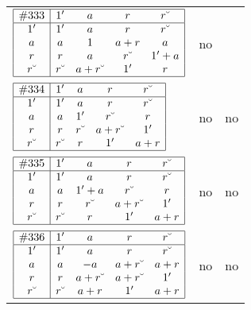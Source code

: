 \documentclass[12pt]{article}
\newcommand{\join}{\mathbin{+}}%
\newcommand{\con}[1]{#1\breve{\ }}
\newcommand{\id}{{1'}}%
\renewcommand{\top}{1}%
\begin{document}
\begin{center}
\begin{longtable}{l|c|c}
$
\begin{array}{|c|cccc|} \hline
\#333 & \id & a & r & \con{r} \\ \hline
\id & \id & a & r & \con{r} \\
a & a & \top & a \join r & a \\
r & r & a & \con{r} & \id \join a \\
\con{r} & \con{r} & a \join \con{r} & \id & r \\ \hline
\end{array}
$
 & no  
 & \adjustbox{valign=c, max height=1.6cm}{$
\left[ \begin{array}{cccccc}
\id & a & r & \con{r} & a & a \\ 
a & \id & a & a & a & r \\ 
\con{r} & a & \id & r & a & a \\ 
r & a & \con{r} & \id & a & a \\ 
a & a & a & a & \id & r \\ 
a & \con{r} & a & a & \con{r} & \id
\end{array}\right]
$}      \\[15mm]

$
\begin{array}{|c|cccc|} \hline
\#334 & \id & a & r & \con{r} \\ \hline
\id & \id & a & r & \con{r} \\
a & a & \id & \con{r} & r \\
r & r & \con{r} & a \join \con{r} & \id \\
\con{r} & \con{r} & r & \id & a \join r \\ \hline
\end{array}
$
 & no  
 & no       \\[15mm]

$
\begin{array}{|c|cccc|} \hline
\#335 & \id & a & r & \con{r} \\ \hline
\id & \id & a & r & \con{r} \\
a & a & \id \join a & \con{r} & r \\
r & r & \con{r} & a \join \con{r} & \id \\
\con{r} & \con{r} & r & \id & a \join r \\ \hline
\end{array}
$
 & no  
 & no       \\[15mm]

$
\begin{array}{|c|cccc|} \hline
\#336 & \id & a & r & \con{r} \\ \hline
\id & \id & a & r & \con{r} \\
a & a & -a & a \join \con{r} & a \join r \\
r & r & a \join \con{r} & a \join \con{r} & \id \\
\con{r} & \con{r} & a \join r & \id & a \join r \\ \hline
\end{array}
$
 & no  
 & no       \\[15mm]


\end{longtable}
\end{center}
\end{document}
